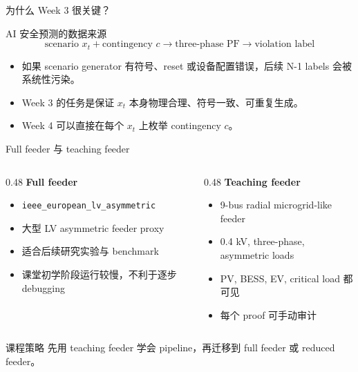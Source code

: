 \documentclass[aspectratio=169,11pt]{beamer}
\begin{document}
\begin{frame}{为什么 Week 3 很关键？}
\begin{block}{AI 安全预测的数据来源}
\[
\text{scenario } x_t + \text{contingency } c \longrightarrow \text{three-phase PF} \longrightarrow \text{violation label}
\]
\end{block}
\begin{itemize}
  \item 如果 scenario generator 有符号、reset 或设备配置错误，后续 N-1 labels 会被系统性污染。
  \item Week 3 的任务是保证 $x_t$ 本身物理合理、符号一致、可重复生成。
  \item Week 4 可以直接在每个 $x_t$ 上枚举 contingency $c$。
\end{itemize}
\end{frame}

\begin{frame}{Full feeder 与 teaching feeder}
\begin{columns}
\begin{column}{0.48\textwidth}
\textbf{Full feeder}\\
\begin{itemize}
  \item \texttt{ieee\_european\_lv\_asymmetric}
  \item 大型 LV asymmetric feeder proxy
  \item 适合后续研究实验与 benchmark
  \item 课堂初学阶段运行较慢，不利于逐步 debugging
\end{itemize}
\end{column}
\begin{column}{0.48\textwidth}
\textbf{Teaching feeder}\\
\begin{itemize}
  \item 9-bus radial microgrid-like feeder
  \item 0.4 kV, three-phase, asymmetric loads
  \item PV, BESS, EV, critical load 都可见
  \item 每个 proof 可手动审计
\end{itemize}
\end{column}
\end{columns}
\vspace{0.3cm}
\begin{block}{课程策略}
先用 teaching feeder 学会 pipeline，再迁移到 full feeder 或 reduced feeder。
\end{block}
\end{frame}
\end{document}
